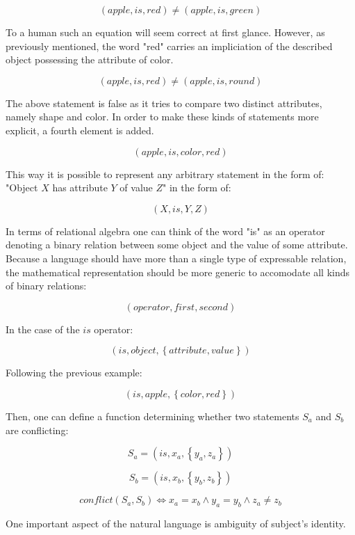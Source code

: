 $$
    \left( apple, is, red \right) \neq \left( apple, is, green \right)
$$

To a human such an equation will seem correct at first glance.
However, as previously mentioned, the word "red" carries an impliciation of the described object possessing the attribute of color.

$$
    \left( apple, is, red \right) \neq \left( apple, is, round \right)
$$

The above statement is false as it tries to compare two distinct attributes, namely shape and color.
In order to make these kinds of statements more explicit, a fourth element is added.

$$
    \left( apple, is, color, red \right)
$$

This way it is possible to represent any arbitrary statement in the form of: "Object $X$ has attribute $Y$ of value $Z$" in the form of:

$$
    \left( X, is, Y, Z \right)
$$

In terms of relational algebra one can think of the word "is" as an operator denoting a binary relation between some object and the value of some attribute.
Because a language should have more than a single type of expressable relation, the mathematical representation should be more generic to accomodate all kinds of binary relations:

$$
    \left( operator, first, second \right)
$$

In the case of the $is$ operator:

$$
    \left( is, object, \left\{ attribute, value \right\} \right)
$$

Following the previous example:

$$
    \left( is, apple, \left\{ color, red \right\} \right)
$$

Then, one can define a function determining whether two statements $S_a$ and $S_b$ are conflicting:

$$
    S_a = \left( is, x_a, \left\{ y_a, z_a \right\} \right)
$$

$$
    S_b = \left( is, x_b, \left\{ y_b, z_b \right\} \right)
$$

$$
    conflict \left( S_a, S_b \right) \iff x_a = x_b \land y_a = y_b \land z_a \neq z_b
$$

One important aspect of the natural language is ambiguity of subject's identity.